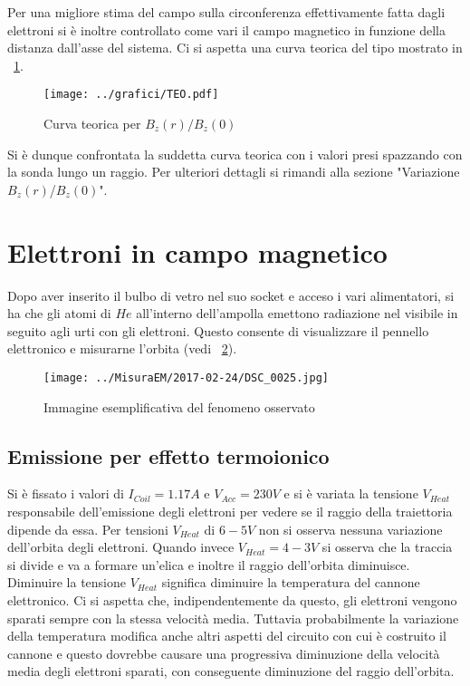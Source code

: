 \documentclass[10pt,a4paper]{article}
\begin{document}
Per una migliore stima del campo sulla circonferenza effettivamente fatta dagli elettroni si è inoltre controllato come vari il campo magnetico in funzione della distanza dall'asse del sistema. Ci si aspetta una curva teorica del tipo mostrato in \figurename{~\ref{fig:TEO}}.


\begin{figure}[H]
	\centering
	\texttt{[image: ../grafici/TEO.pdf]}
	\caption{Curva teorica per $B_z(r)/B_z(0)$}
	\label{fig:TEO}
\end{figure}


Si è dunque confrontata la suddetta curva teorica con i valori presi spazzando con la sonda lungo un raggio. Per ulteriori dettagli si rimandi alla sezione "Variazione $B_z(r)$/$B_z(0)$".



\section{Elettroni in campo magnetico}
Dopo aver inserito il bulbo di vetro nel suo socket e acceso i vari alimentatori, si ha che gli atomi di $He$ all'interno dell'ampolla emettono radiazione nel visibile in seguito agli urti con gli elettroni. Questo consente di visualizzare il pennello elettronico e misurarne l'orbita (vedi \figurename{~\ref{fig:ex1}}).

\begin{figure}[H]
	\centering
	\texttt{[image: ../MisuraEM/2017-02-24/DSC\_0025.jpg]}
	\caption{Immagine esemplificativa del fenomeno osservato}
	\label{fig:ex1}
\end{figure}

\subsection{Emissione per effetto termoionico}

Si è fissato i valori di $I_{Coil} = \unit{1.17}{A}$ e $V_{Acc} = \unit{230}{V}$ e si è variata la tensione $V_{Heat}$ responsabile dell'emissione degli elettroni per vedere se il raggio della traiettoria dipende da essa.
Per tensioni $V_{Heat}$ di $\unit{6-5}{V}$ non si osserva nessuna variazione dell'orbita degli elettroni. Quando invece $V_{Heat} = \unit{4-3}{V}$ si osserva che la traccia si divide e va a formare un'elica e inoltre il raggio dell'orbita diminuisce. Diminuire la tensione $V_{Heat}$ significa diminuire la temperatura del cannone elettronico. Ci si aspetta che, indipendentemente da questo, gli elettroni vengono sparati sempre con la stessa velocità media. Tuttavia probabilmente la variazione della temperatura modifica anche altri aspetti del circuito con cui è costruito il cannone e questo dovrebbe causare una progressiva diminuzione della velocità media degli elettroni sparati, con conseguente diminuzione del raggio dell'orbita.
\end{document}
